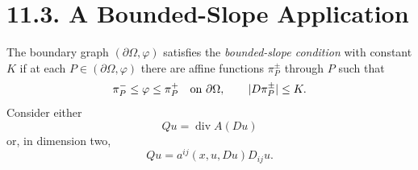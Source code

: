 \section*{11.3. A Bounded-Slope Application}

The boundary graph $(\partial\Omega,\varphi)$ satisfies the
\emph{bounded-slope condition} with constant $K$ if at each
$P\in(\partial\Omega,\varphi)$ there are affine functions $\pi_P^\pm$ through
$P$ such that
\[
\pi_P^-\leq\varphi\leq\pi_P^+\quad\hbox{on }\partial\Omega,
\qquad |D\pi_P^\pm|\leq K.
\]
Consider either
\begin{equation}
\tag{11.7}
Qu=\operatorname{div}A(Du)
\end{equation}
or, in dimension two,
\begin{equation}
\tag{11.8}
Qu=a^{ij}(x,u,Du)D_{ij}u.
\end{equation}

